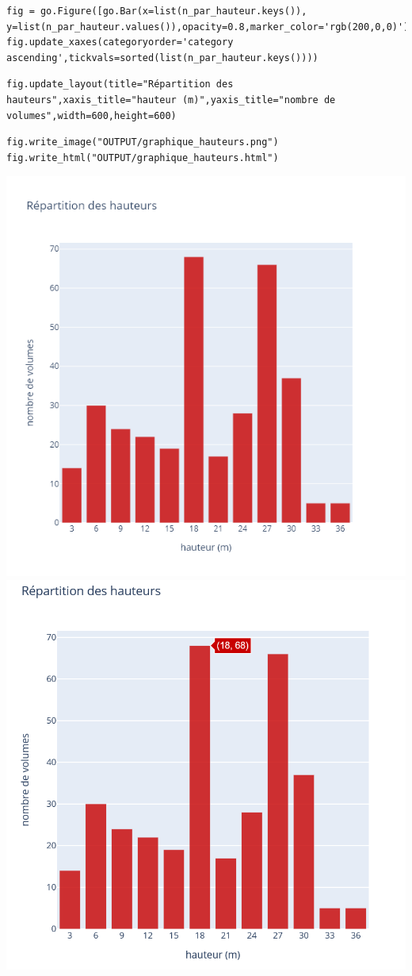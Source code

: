 \documentclass[
  11pt,
  french,
]{article}
\newcounter{customfigs}[section]
\newenvironment{customfigs}[1][] {
    \stepcounter{customfigs}
    Fig \arabic{section}. \arabic{customfigs} : }
\newcommand{\masked}{\vspace*{-\baselineskip}}
\begin{document}
\begin{tcolorbox}[title= Génération du graphique et export ,colback=boitecode]
\begin{lstlisting}[style=code]
fig = go.Figure([go.Bar(x=list(n_par_hauteur.keys()), y=list(n_par_hauteur.values()),opacity=0.8,marker_color='rgb(200,0,0)')])
fig.update_xaxes(categoryorder='category ascending',tickvals=sorted(list(n_par_hauteur.keys())))\end{lstlisting}
\begin{lstlisting}[style=code]
fig.update_layout(title="Répartition des hauteurs",xaxis_title="hauteur (m)",yaxis_title="nombre de volumes",width=600,height=600)\end{lstlisting}
\begin{lstlisting}[style=code]
fig.write_image("OUTPUT/graphique_hauteurs.png")
fig.write_html("OUTPUT/graphique_hauteurs.html")\end{lstlisting}
\end{tcolorbox}

\begin{tcolorbox}[title=\begin{customfigs} Nombre de volumes par hauteur \end{customfigs}]

\begin{center}\includegraphics[width=0.45\linewidth]{OUTPUT/graphique_hauteurs} \includegraphics[width=0.45\linewidth]{__imgs/graphique_hauteurs_int} \end{center}

\end{tcolorbox}
\end{document}
